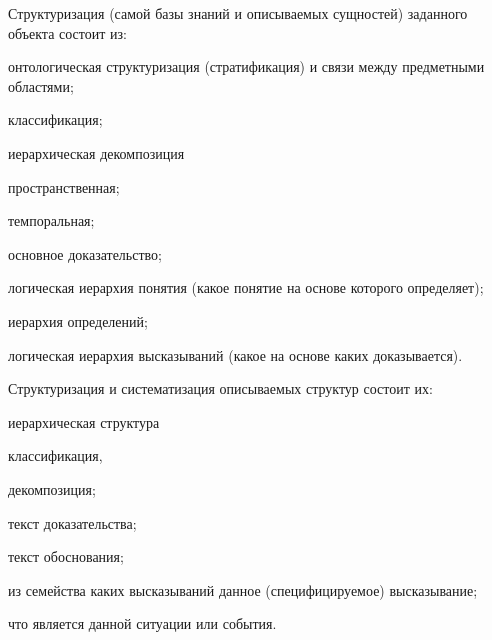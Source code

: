 \begin{SCn}
\end{SCn}

\begin{SCn}
\end{SCn}

Структуризация (самой базы знаний и описываемых сущностей) заданного объекта состоит из:
\begin{textitemize}
	\item онтологическая структуризация (стратификация) и связи между предметными областями;
	\item классификация;
	\item иерархическая декомпозиция
	\begin{textitemize}
		\item пространственная;
		\item темпоральная;
	\end{textitemize}
	\item основное доказательство;
	\item логическая иерархия понятия (какое понятие на основе которого определяет);
	\item иерархия определений;
	\item логическая иерархия высказываний (какое на основе каких доказывается).
\end{textitemize}

Структуризация и систематизация описываемых структур состоит их:
\begin{textitemize}
	\item иерархическая структура
	\begin{textitemize}
		\item классификация,
		\item декомпозиция;
	\end{textitemize}
	\item текст доказательства;
	\item текст обоснования;
	\item из семейства каких высказываний  данное (специфицируемое) высказывание;
	\item что является  данной ситуации или события.
\end{textitemize}

\vskip 1cm

